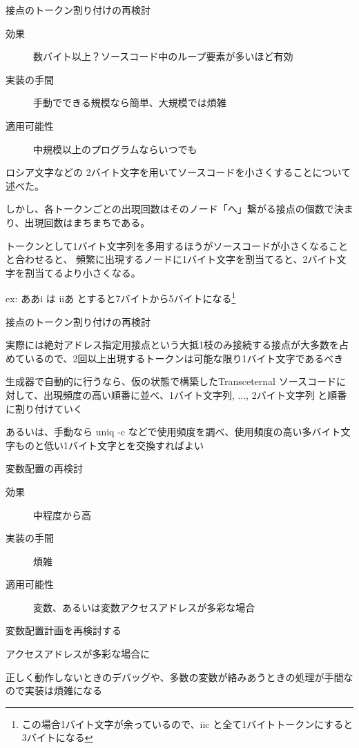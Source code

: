 \documentclass[12pt,unicode]{beamer}
\begin{document}
\begin{frame}{接点のトークン割り付けの再検討}
   \begin{description}
      \item[効果] 数バイト以上？ソースコード中のループ要素が多いほど有効
      \item[実装の手間] 手動でできる規模なら簡単、大規模では煩雑
      \item[適用可能性] 中規模以上のプログラムならいつでも
   \end{description}

   ロシア文字などの 2バイト文字を用いてソースコードを小さくすることについて述べた。

   しかし、各トークンごとの出現回数はそのノード「へ」繋がる接点の個数で決まり、出現回数はまちまちである。

   トークンとして1バイト文字列を多用するほうがソースコードが小さくなることと合わせると、
   頻繁に出現するノードに1バイト文字を割当てると、2バイト文字を割当てるより小さくなる。

   ex: ああi は iiあ とすると7バイトから5バイトになる\footnote{この場合1バイト文字が余っているので、iic と全て1バイトトークンにすると3バイトになる}
\end{frame}

\begin{frame}{接点のトークン割り付けの再検討}

   実際には絶対アドレス指定用接点という大抵1枝のみ接続する接点が大多数を占めているので、2回以上出現するトークンは可能な限り1バイト文字であるべき

   生成器で自動的に行うなら、仮の状態で構築したTransceternal ソースコードに対して、出現頻度の高い順番に並べ、1バイト文字列, ..., 2バイト文字列 と順番に割り付けていく

   あるいは、手動なら uniq -c などで使用頻度を調べ、使用頻度の高い多バイト文字ものと低い1バイト文字とを交換すればよい
\end{frame}

\begin{frame}{変数配置の再検討}
   \begin{description}
      \item[効果] 中程度から高
      \item[実装の手間] 煩雑
      \item[適用可能性] 変数、あるいは変数アクセスアドレスが多彩な場合
   \end{description}

   変数配置計画を再検討する

   アクセスアドレスが多彩な場合に

   正しく動作しないときのデバッグや、多数の変数が絡みあうときの処理が手間なので実装は煩雑になる
\end{frame}
\end{document}

